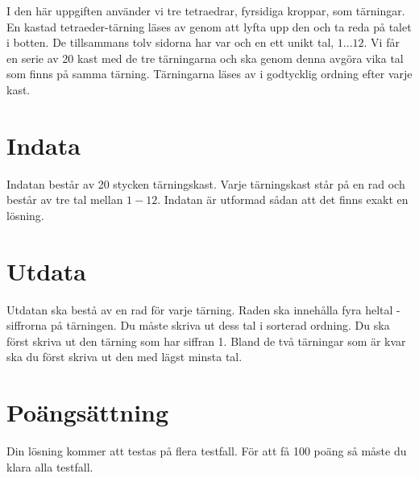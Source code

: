 
I den här uppgiften använder vi tre tetraedrar, fyrsidiga kroppar, som tärningar. En kastad tetraeder-tärning läses av genom att lyfta upp den och ta reda på talet i botten. De tillsammans tolv sidorna har var och en ett unikt tal, $1...12$. Vi får en serie av 20 kast med de tre tärningarna och ska genom denna avgöra vika tal som finns på samma tärning. Tärningarna läses av i godtycklig ordning efter varje kast.

\section*{Indata}
Indatan består av 20 stycken tärningskast. Varje tärningskast står på en rad och består av tre tal mellan $1-12$. Indatan är utformad
sådan att det finns exakt en lösning.

\section*{Utdata}
Utdatan ska bestå av en rad för varje tärning. Raden ska innehålla fyra heltal - siffrorna på tärningen. Du måste skriva ut dess tal i sorterad ordning. Du ska först skriva ut den tärning som har siffran 1. Bland de två tärningar som är kvar ska du först skriva ut den med lägst minsta tal.

\section*{Poängsättning}
Din lösning kommer att testas på flera testfall. För att få 100 poäng så måste du klara alla testfall.
